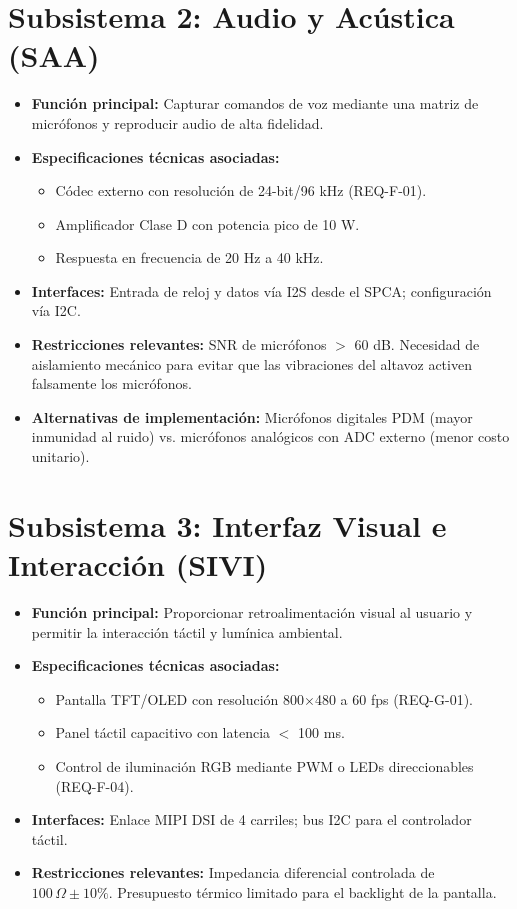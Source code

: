 \documentclass[%
	paper=a4,
	twoside=false,
	parskip=half,
	chapterprefix=false,
	10pt,
	headings=normal,
	bibliography=totoc,
	listof=totoc,
	titlepage=on,
	captions=tableabove,
	draft=false, 
]{scrbook}%
\begin{document}
\section{Subsistema 2: Audio y Acústica (SAA)}
\begin{itemize}
    \item \textbf{Función principal:} Capturar comandos de voz mediante una matriz de micrófonos y reproducir audio de alta fidelidad.
    \item \textbf{Especificaciones técnicas asociadas:}
        \begin{itemize}
            \item Códec externo con resolución de 24-bit/96 kHz (REQ-F-01).
            \item Amplificador Clase D con potencia pico de 10 W.
            \item Respuesta en frecuencia de 20 Hz a 40 kHz.
        \end{itemize}
    \item \textbf{Interfaces:} Entrada de reloj y datos vía I2S desde el SPCA; configuración vía I2C.
    \item \textbf{Restricciones relevantes:} SNR de micrófonos $>$ 60 dB. Necesidad de aislamiento mecánico para evitar que las vibraciones del altavoz activen falsamente los micrófonos.
    \item \textbf{Alternativas de implementación:} Micrófonos digitales PDM (mayor inmunidad al ruido) vs. micrófonos analógicos con ADC externo (menor costo unitario).
\end{itemize}

\section{Subsistema 3: Interfaz Visual e Interacción (SIVI)}
\begin{itemize}
    \item \textbf{Función principal:} Proporcionar retroalimentación visual al usuario y permitir la interacción táctil y lumínica ambiental.
    \item \textbf{Especificaciones técnicas asociadas:}
        \begin{itemize}
            \item Pantalla TFT/OLED con resolución 800$\times$480 a 60 fps (REQ-G-01).
            \item Panel táctil capacitivo con latencia $<$ 100 ms.
            \item Control de iluminación RGB mediante PWM o LEDs direccionables (REQ-F-04).
        \end{itemize}
    \item \textbf{Interfaces:} Enlace MIPI DSI de 4 carriles; bus I2C para el controlador táctil.
    \item \textbf{Restricciones relevantes:} Impedancia diferencial controlada de $100\,\Omega \pm 10\%$. Presupuesto térmico limitado para el backlight de la pantalla.
\end{itemize}
\end{document}
